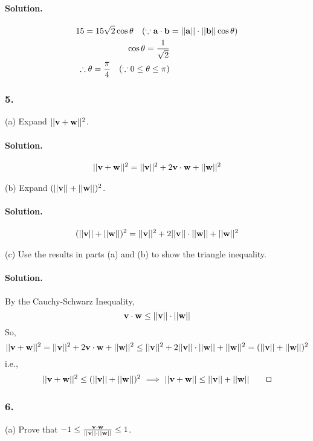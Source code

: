 \paragraph{Solution.}
\begin{align*}
    15 = 15 \sqrt{2}\cos\theta\quad(\because \vb{a} \cdot \vb{b} &= ||\vb{a}||\cdot||\vb{b}||\cos\theta)\\
    \cos\theta = \frac{1}{\sqrt{2}}\\
    \therefore \theta = \frac{\pi}{4} \quad(\because 0 \leq \theta \leq \pi)
\end{align*}

\subsubsection{5.}
(a) Expand $||\vb{v} + \vb{w}||^2$.
\paragraph{Solution.}
\begin{align*}
    ||\vb{v} + \vb{w}||^2 = ||\vb{v}||^2 + 2\vb{v}\cdot\vb{w} + ||\vb{w}||^2
\end{align*}

(b) Expand $(||\vb{v}||+||\vb{w}||)^2$.
\paragraph{Solution.}
\begin{align*}
    (||\vb{v}|| + ||\vb{w}||)^2 = ||\vb{v}||^2 + 2||\vb{v}||\cdot||\vb{w}|| + ||\vb{w}||^2
\end{align*}

(c) Use the results in parts (a) and (b) to show the triangle inequality.
\paragraph{Solution.}
By the Cauchy-Schwarz Inequality, $$\vb{v}\cdot\vb{w} \leq ||\vb{v}||\cdot||\vb{w}||$$
So, $$||\vb{v} + \vb{w}||^2 = ||\vb{v}||^2 + 2\vb{v}\cdot\vb{w} + ||\vb{w}||^2\leq||\vb{v}||^2 + 2||\vb{v}||\cdot||\vb{w}|| + ||\vb{w}||^2 = (||\vb{v}|| + ||\vb{w}||)^2$$
i.e., \begin{align*}
    ||\vb{v} + \vb{w}||^2\leq(||\vb{v}|| + ||\vb{w}||)^2 \ \Longrightarrow\ ||\vb{v} + \vb{w}|| \leq ||\vb{v}|| + ||\vb{w}||
    \tag*{$\qed$}
\end{align*}

\subsubsection{6.}
(a) Prove that $-1\leq\frac{\vb{v}\cdot\vb{w}}{||\vb{v}||\cdot||\vb{w}||}\leq1$.
